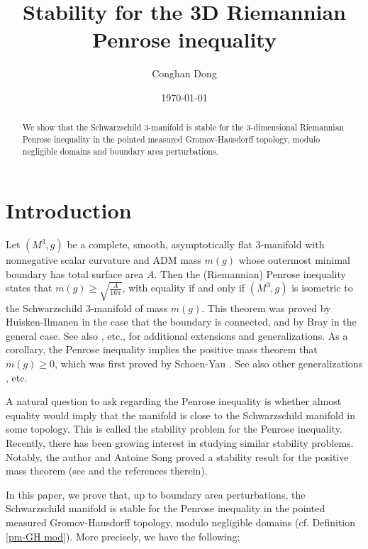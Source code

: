 \documentclass[letter]{amsart}
\title{Stability for the 3D Riemannian Penrose inequality}
\author{Conghan Dong}
\theoremstyle{definition}
\theoremstyle{remark}
\begin{document}
\date{\today}

\maketitle

\begin{abstract}
We show that the Schwarzschild $3$-manifold is stable for the $3$-dimensional Riemannian Penrose inequality in the pointed measured Gromov-Hausdorff topology, modulo negligible domains and boundary area perturbations. 
\end{abstract}

\tableofcontents

\section{Introduction}

Let $(M^3, g)$ be a complete, smooth, asymptotically flat $3$-manifold with nonnegative scalar curvature and ADM mass $m(g)$ whose outermost minimal boundary has total surface area $A$. Then the (Riemannian) Penrose inequality states that $m(g) \geq \sqrt{\frac{A}{16 \pi }} $, with equality if and only if $(M^3, g)$ is isometric to the Schwarzschild $3$-manifold of mass $m(g)$. This theorem was proved by Huisken-Ilmanen \cite{HI'01} in the case that the boundary is connected, and by Bray \cite{Bray'01} in the general case. See also \cite{BrayLee'09,KWY17,AMMO22}, etc., for additional extensions and generalizations. As a corollary, the Penrose inequality implies the positive mass theorem that $m(g) \geq 0$, which was first proved by Schoen-Yau \cite{SY79}. See also other generalizations \cite{Witten81, SY'81}, etc.

A natural question to ask regarding the Penrose inequality is whether almost equality would imply that the manifold is close to the Schwarzschild manifold in some topology. This is called the stability problem for the Penrose inequality. Recently, there has been growing interest in studying similar stability problems. Notably, the author and Antoine Song proved a stability result for the positive mass theorem (see \cite{DS'23} and the references therein).

In this paper, we prove that, up to boundary area perturbations, the Schwarzschild manifold is stable for the Penrose inequality in the pointed measured Gromov-Hausdorff topology, modulo negligible domains (cf. Definition \ref{pm-GH mod}). More precisely, we have the following:
\end{document}
